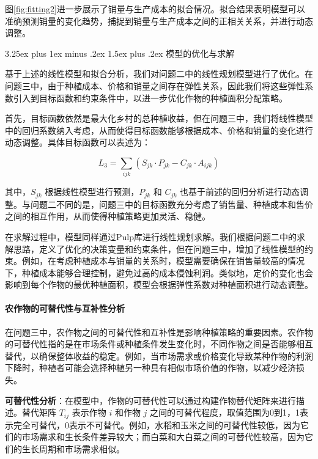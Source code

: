 \documentclass[12pt,a4paper]{nmmcm}
\makeatletter
\renewcommand\subsection{\@startsection{subsection}{2}{0pt}%
    {3.25ex plus 1ex minus .2ex}%
    {1.5ex plus .2ex}%
    {\normalfont\Large\bfseries}}
\makeatother
\begin{document}
图\ref{fig:fitting2}进一步展示了销量与生产成本的拟合情况。拟合结果表明模型可以准确预测销量的变化趋势，捕捉到销量与生产成本之间的正相关关系，并进行动态调整。











\subsection{模型的优化与求解}

基于上述的线性模型和拟合分析，我们对问题二中的线性规划模型进行了优化。在问题三中，由于种植成本、价格和销量之间存在弹性关系，因此我们将这些弹性系数引入到目标函数和约束条件中，以进一步优化作物的种植面积分配策略。

首先，目标函数依然是最大化乡村的总种植收益，但在问题三中，我们将线性模型中的回归系数纳入考虑，从而使得目标函数能够根据成本、价格和销量的变化进行动态调整。具体目标函数可以表述为：

\[
  L_3 = \sum_{ijk} \left( S_{jk} \cdot P_{jk} - C_{jk} \cdot A_{ijk} \right)
\]

其中，$S_{jk}$ 根据线性模型进行预测，$P_{jk}$ 和 $C_{jk}$ 也基于前述的回归分析进行动态调整。与问题二不同的是，问题三中的目标函数充分考虑了销售量、种植成本和售价之间的相互作用，从而使得种植策略更加灵活、稳健。

在求解过程中，模型同样通过Pulp库进行线性规划求解。我们根据问题二中的求解思路，定义了优化的决策变量和约束条件，但在问题三中，增加了线性模型的约束。例如，在考虑种植成本与销量的关系时，模型需要确保在销售量较高的情况下，种植成本能够合理控制，避免过高的成本侵蚀利润。类似地，定价的变化也会影响到每个作物的最优种植面积，模型会根据弹性系数对种植面积进行动态调整。


\paragraph{农作物的可替代性与互补性分析}

在问题三中，农作物之间的可替代性和互补性是影响种植策略的重要因素。农作物的可替代性指的是在市场条件或种植条件发生变化时，不同作物之间是否能够相互替代，以确保整体收益的稳定。例如，当市场需求或价格变化导致某种作物的利润下降时，种植者可能会选择种植另一种具有相似市场价值的作物，以减少经济损失。

\textbf{可替代性分析}：在模型中，作物的可替代性可以通过构建作物替代矩阵来进行描述。替代矩阵 $T_{ij}$ 表示作物 $i$ 和作物 $j$ 之间的可替代程度，取值范围为0到1，1表示完全可替代，0表示不可替代。例如，水稻和玉米之间的可替代性较低，因为它们的市场需求和生长条件差异较大；而白菜和大白菜之间的可替代性较高，因为它们的生长周期和市场需求相似。
\end{document}
